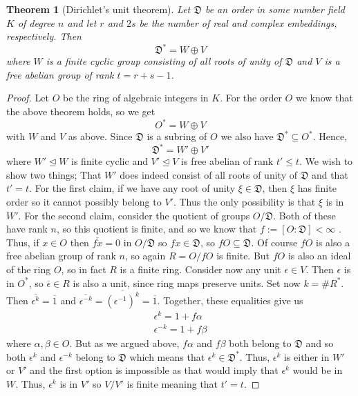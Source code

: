 \documentclass{article}
\newtheorem{theorem}{Theorem}[section]
\newcommand{\mfrak}[1]{\mathfrak{#1}}
\numberwithin{equation}{section}
\begin{document}
\begin{theorem}[Dirichlet's unit theorem]
    Let $\mfrak D$ be an order in some number field $K$ of degree $n$ and let $r$ and $2s$ be the number of real and complex embeddings, respectively. Then $$\mfrak D^* = W \oplus V$$
    where $W$ is a finite cyclic group consisting of all roots of unity of $\mfrak D$ and $V$ is a free abelian group of rank $t = r + s - 1$.
\end{theorem}
\begin{proof}
    Let $O$ be the ring of algebraic integers in $K$. For the order $O$ we know that the above theorem holds, so we get
    $$O^* = W \oplus V$$
    with $W$ and $V$ as above. Since $\mfrak D$ is a subring of $O$ we also have $\mfrak D^* \subseteq O^*$. Hence, $$\mfrak D^* = W' \oplus V'$$
    where $W' \trianglelefteq W$ is finite cyclic and $V' \trianglelefteq V$ is free abelian of rank $t' \leq t$. We wish to show two things; That $W'$ does indeed consist of all roots of unity of $\mfrak D$ and that $t' = t$. For the first claim, if we have any root of unity $\xi \in \mfrak{D}$, then $\xi$ has finite order so it cannot possibly belong to $V'$. Thus the only possibility is that $\xi$ is in $W'$. For the second claim, consider the quotient of groups $O / \mfrak D$. Both of these have rank $n$, so this quotient is finite, and so we know that $f := [O : \mfrak D] < \infty$ . Thus, if $x \in O$ then $\overline {fx} = 0$ in $O / \mfrak D$ so $fx \in \mfrak D$, so $f O \subseteq \mfrak D$. Of course $f O$ is also a free abelian group of rank $n$, so again $R = O / f O$ is finite. But $fO$ is also an ideal of the ring $O$, so in fact $R$ is a finite ring. Consider now any unit $\epsilon \in V$. Then $\epsilon$ is in $O^*$, so $\overline \epsilon \in R$ is also a unit, since ring maps preserve units. Set now $k = \# R^*$. Then $\overline {\epsilon^k} = \overline 1$ and $\overline {\epsilon^{-k}} = \overline {(\epsilon^{-1})^k} = \overline 1$. Together, these equalities give us
    \begin{align*}
        \epsilon^k = 1 + f \alpha \\
        \epsilon^{-k} = 1 + f \beta
    \end{align*}
    where $\alpha, \beta \in O$. But as we argued above, $f \alpha$ and $f \beta$ both belong to $\mfrak D$ and so both $\epsilon^k$ and $\epsilon^{-k}$ belong to $\mfrak D$ which means that  $\epsilon^k \in \mfrak D^*$. Thus, $\epsilon^k$ is either in $W'$ or $V'$ and the first option is impossible as that would imply that $\epsilon^k$ would be in $W$. Thus, $\epsilon^k$ is in $V'$ so $V / V'$ is finite meaning that $t' = t$.
\end{proof}
\end{document}
